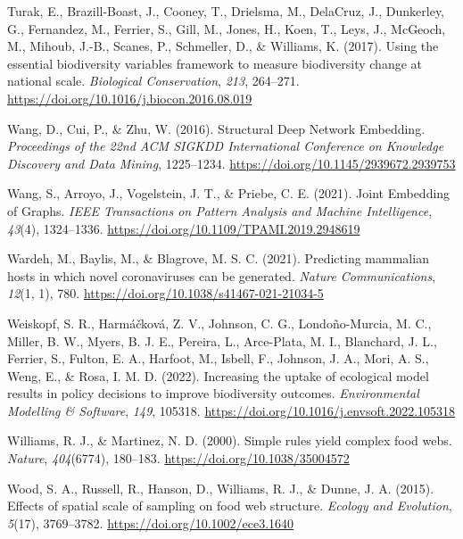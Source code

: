 \documentclass[11pt]{article}
\newlength{\cslhangindent}
\newenvironment{CSLReferences}[2] %
 {%
  \setlength{\parindent}{0pt}
  \ifodd #1 \everypar{\setlength{\hangindent}{\cslhangindent}}\ignorespaces\fi
  \ifnum #2 > 0
  \setlength{\parskip}{#2\baselineskip}
  \fi
 }%
 {}
\begin{document}
\begin{CSLReferences}{1}{0}
\leavevmode{}%
Turak, E., Brazill-Boast, J., Cooney, T., Drielsma, M., DelaCruz, J.,
Dunkerley, G., Fernandez, M., Ferrier, S., Gill, M., Jones, H., Koen,
T., Leys, J., McGeoch, M., Mihoub, J.-B., Scanes, P., Schmeller, D., \&
Williams, K. (2017). Using the essential biodiversity variables
framework to measure biodiversity change at national scale.
\emph{Biological Conservation}, \emph{213}, 264--271.
\url{https://doi.org/10.1016/j.biocon.2016.08.019}

\leavevmode{}%
Wang, D., Cui, P., \& Zhu, W. (2016). Structural Deep Network Embedding.
\emph{Proceedings of the 22nd ACM SIGKDD International Conference on
Knowledge Discovery and Data Mining}, 1225--1234.
\url{https://doi.org/10.1145/2939672.2939753}

\leavevmode{}%
Wang, S., Arroyo, J., Vogelstein, J. T., \& Priebe, C. E. (2021). Joint
Embedding of Graphs. \emph{IEEE Transactions on Pattern Analysis and
Machine Intelligence}, \emph{43}(4), 1324--1336.
\url{https://doi.org/10.1109/TPAMI.2019.2948619}

\leavevmode{}%
Wardeh, M., Baylis, M., \& Blagrove, M. S. C. (2021). Predicting
mammalian hosts in which novel coronaviruses can be generated.
\emph{Nature Communications}, \emph{12}(1, 1), 780.
\url{https://doi.org/10.1038/s41467-021-21034-5}

\leavevmode{}%
Weiskopf, S. R., Harmáčková, Z. V., Johnson, C. G., Londoño-Murcia, M.
C., Miller, B. W., Myers, B. J. E., Pereira, L., Arce-Plata, M. I.,
Blanchard, J. L., Ferrier, S., Fulton, E. A., Harfoot, M., Isbell, F.,
Johnson, J. A., Mori, A. S., Weng, E., \& Rosa, I. M. D. (2022).
Increasing the uptake of ecological model results in policy decisions to
improve biodiversity outcomes. \emph{Environmental Modelling \&
Software}, \emph{149}, 105318.
\url{https://doi.org/10.1016/j.envsoft.2022.105318}

\leavevmode{}%
Williams, R. J., \& Martinez, N. D. (2000). Simple rules yield complex
food webs. \emph{Nature}, \emph{404}(6774), 180--183.
\url{https://doi.org/10.1038/35004572}

\leavevmode{}%
Wood, S. A., Russell, R., Hanson, D., Williams, R. J., \& Dunne, J. A.
(2015). Effects of spatial scale of sampling on food web structure.
\emph{Ecology and Evolution}, \emph{5}(17), 3769--3782.
\url{https://doi.org/10.1002/ece3.1640}


\end{CSLReferences}
\end{document}
